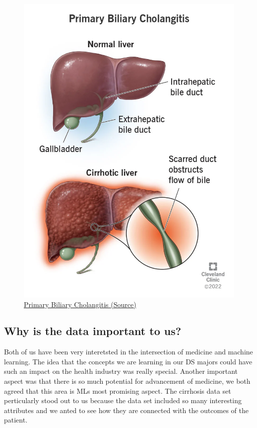\documentclass[
]{article}
\begin{document}
\begin{figure}
\centering
\includegraphics{17715-primary-biliary-cholangitis.webp}
\caption{\ul{Primary Biliary Cholangitis
(\href{https://www.google.com/search?client=safari\&sca_esv=591276386\&rls=en\&sxsrf=AM9HkKmtJVOC2Jrf2BSYVB2O-QcnTSgx6g:1702664705100\&q=Primary+Biliary+Cholangitis\&tbm=isch\&source=lnms\&sa=X\&ved=2ahUKEwid0qyniJKDAxX9FFkFHVH3CcoQ0pQJegQIDxAB\&biw=1440\&bih=848\&dpr=2\#imgrc=UeV_fhP-8vPOlM}{Source})}}
\end{figure}

\hypertarget{why-is-the-data-important-to-us}{%
\subsection{Why is the data important to
us?}\label{why-is-the-data-important-to-us}}

Both of us have been very interetsted in the intersection of medicine
and machine learning. The idea that the concepts we are learning in our
DS majors could have such an impact on the health industry was really
special. Another important aspect was that there is so much potential
for advancement of medicine, we both agreed that this area is MLs most
promising aspect. The cirrhosis data set perticularly stood out to us
because the data set included so many interesting attributes and we
anted to see how they are connected with the outcomes of the patient.
\end{document}
